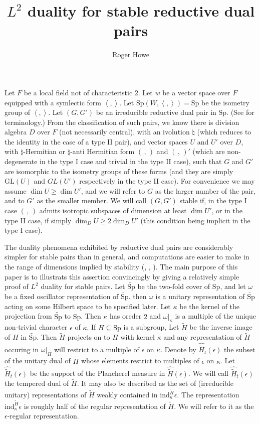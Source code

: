 \documentclass[12pt]{amsart}
\title{$L^2$ duality for stable reductive dual pairs}
\author{Roger Howe}
\def\inn#1#2{\left\langle{#1},{#2}\right\rangle}
\def\Sp{{\mathrm{Sp}}}
\def\tSp{{\widetilde{\mathrm{Sp}}}}
\def\GL{{\mathrm{GL}}}
\def\tH{{\widetilde{H}}}
\def\htH{\widehat{\widetilde{H}}}
\def\kk{\kappa}
\def\inv{{\natural}}
\def\ind{{\mathrm{ind}}}
\begin{document}
\maketitle

 Let $F$ be a local field not of characteristic $2$. 
Let $w$ be a vector space over $F$ equipped with a symlectic form 
$\inn{}{}$. 
Let $\Sp(W,\inn{}{})=\Sp$ be the isometry group of $\inn{}{}$.
Let $(G,G')$ be an irreducible reductive dual pair in $\Sp$. 
(See \cite{Howe1979} for terminology.) From the classification 
\cite{Howe1979} of such pairs, we know there is division algebra $D$ over
$F$ (not necessarily central), with an ivolution $\inv$ 
(which reduces to the identity in the case of a type II pair), 
and vector spaces $U$ and $U'$ over $D$, with $\inv$-Hermitian 
or $\inv$-anti Hermitian form $(\, ,\, )$ and $(\, , \,)'$
(which are non-degenerate in the type I case and trivial in the 
type II case), such that $G$ and $G'$ are isomorphic to the isometry groups 
of these forms (and they are simply $\GL(U)$ and $GL(U')$  respectively in 
the type II case). For convenience we may assume $\dim U \geq \dim U'$,
and we will refer to $G$ as the larger number of the pair, and 
to $G'$ as the smaller member. We will call $(G,G')$ stable if, 
in the type I case $(\,,\,)$ admits isotropic subspaces of dimension at least
$\dim U'$, or in the type II case, if simply $\dim_D U\geq 2\dim_D U'$
(this condition being implicit in the type I case).

The duality phenomena exhibited by reductive dual pairs \cite{Howe1979}
are considerably simpler for stable pairs than in general,
and computations are easier to make in the range of dimensions implied
by stability (\cite{Gelbart1979}, \cite{Gross1977}, \cite{Weil1965}). 
The main purpose of this paper is to illustrats this assertion convincingly
by giving a relatively simple proof of $L^2$ duality for stable pairs.
Let $\tSp$ be the two-fold cover of $\Sp$, and let $\omega$ be a fixed
oscillator representation of $\tSp$. then $\omega$ is a unitary representation 
of $\tSp$ acting on some Hilbert space to be specified later. 
Let $\kk$ be the kernel of the projection from $\tSp$ to $\Sp$. 
Then $\kk$ has oreder $2$ and $\omega|_\kk$ is a multiple of the unique
non-trivial character $\epsilon$ of $\kk$.
If $H\subseteq \Sp$ is a subgroup, Let $\tH$ be the inverse image of $H$
in $\tSp$. Then $\tH$ projects on to $H$ with kernel $\kk$ and 
any representation of $\tH$ occuring in $\omega|_{\tH}$ will 
restrict to a multiple of $\epsilon$ on $\kk$. 
Denote by $\htH_t(\epsilon)$ the subset of the unitary dual of 
$\tH$ whose elements restrict to multiples of $\epsilon$ on $\kk$.
Let $\htH_t(\epsilon)$ be the support of the Plancherel measure in 
$\htH(\epsilon)$. We will call $\htH_t(\epsilon)$ the tempered
dual of $\tH$. It may also be described as the set of (irreducible unitary)
representations of $\tH$ weakly contained in $\ind_\kk^{\tH}\epsilon$.
The representation $\ind_\kk^{\tH}\epsilon$ is roughly half of 
the regular representation of $\tH$.
We will refer to it as the $\epsilon$-regular representation.
\end{document}
